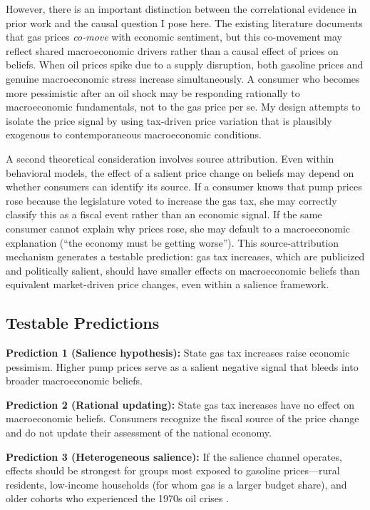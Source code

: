 \documentclass[12pt]{article}
\begin{document}
However, there is an important distinction between the correlational evidence in prior work and the causal question I pose here. The existing literature documents that gas prices \textit{co-move} with economic sentiment, but this co-movement may reflect shared macroeconomic drivers rather than a causal effect of prices on beliefs. When oil prices spike due to a supply disruption, both gasoline prices and genuine macroeconomic stress increase simultaneously. A consumer who becomes more pessimistic after an oil shock may be responding rationally to macroeconomic fundamentals, not to the gas price per se. My design attempts to isolate the price signal by using tax-driven price variation that is plausibly exogenous to contemporaneous macroeconomic conditions.

A second theoretical consideration involves source attribution. Even within behavioral models, the effect of a salient price change on beliefs may depend on whether consumers can identify its source. If a consumer knows that pump prices rose because the legislature voted to increase the gas tax, she may correctly classify this as a fiscal event rather than an economic signal. If the same consumer cannot explain why prices rose, she may default to a macroeconomic explanation (``the economy must be getting worse''). This source-attribution mechanism generates a testable prediction: gas tax increases, which are publicized and politically salient, should have smaller effects on macroeconomic beliefs than equivalent market-driven price changes, even within a salience framework.

\subsection{Testable Predictions}

\textbf{Prediction 1 (Salience hypothesis):} State gas tax increases raise economic pessimism. Higher pump prices serve as a salient negative signal that bleeds into broader macroeconomic beliefs.

\textbf{Prediction 2 (Rational updating):} State gas tax increases have no effect on macroeconomic beliefs. Consumers recognize the fiscal source of the price change and do not update their assessment of the national economy.

\textbf{Prediction 3 (Heterogeneous salience):} If the salience channel operates, effects should be strongest for groups most exposed to gasoline prices---rural residents, low-income households (for whom gas is a larger budget share), and older cohorts who experienced the 1970s oil crises \citep{malmendier2016learning, binder2022stuck}.
\end{document}
